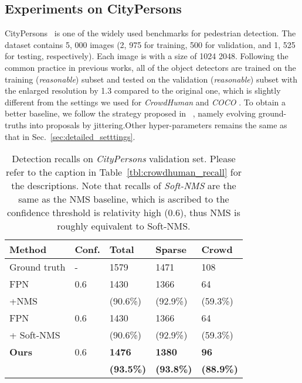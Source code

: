 \documentclass[10pt,twocolumn,letterpaper]{article}
\begin{document}
\subsection{Experiments on CityPersons}

CityPersons~\cite{zhang2017citypersons} is one of the widely used benchmarks for pedestrian detection. The dataset contains 5, 000 images (2, 975 for training, 500 for validation, and 1, 525 for testing, respectively). Each image is with a size of 1024  2048. Following the common practice in previous works, all of the object detectors are trained on the training (\emph{reasonable}) subset and tested on the validation (\emph{reasonable}) subset with the enlarged resolution by 1.3 compared to the original one, which is slightly different from the settings we used for \emph{CrowdHuman} \cite{shao2018crowdhuman} and \emph{COCO} \cite{lin2014microsoft}. To obtain a better baseline, we follow the strategy proposed in ~\cite{chi2019pedhunter}, namely evolving ground-truths into proposals by jittering.Other hyper-parameters remains the same as that in Sec.~\ref{sec:detailed_setttings}.  

\begin{table}[ht]
\centering
\begin{tabular}{p{23mm}|p{9mm}<{\centering}|p{10mm}<{\centering}p{10mm}<{\centering}p{10mm}<{\centering}}
\toprule
 Method & Conf. & Total & Sparse  & Crowd \\
\hline
Ground truth & - & 1579 & 1471 & 108 \\
\hline
FPN & 0.6 & 1430   & 1366 & 64 \\
+NMS & & (90.6\%) & (92.9\%) & (59.3\%) \\
\hline
FPN  & 0.6 & 1430   & 1366 & 64 \\
 + Soft-NMS \cite{softnms} & & (90.6\%) & (92.9\%) & (59.3\%) \\
\hline

\textbf{Ours}  & 0.6 &  \textbf{1476} & \textbf{1380} & \textbf{96} \\
       	& & \textbf{(93.5\%)} & \textbf{(93.8\%)} & \textbf{(88.9\%)} \\
\bottomrule
\end{tabular}
\caption{Detection recalls on \emph{CityPersons} validation set. Please refer to the caption in Table~\ref{tbl:crowdhuman_recall} for the descriptions. Note that recalls of \emph{Soft-NMS} \cite{softnms} are the same as the NMS baseline, which is ascribed to the confidence threshold is relativity high (0.6), thus NMS is roughly equivalent to Soft-NMS. }

\label{tbl:citypersons_recall}
\end{table}
\end{document}
